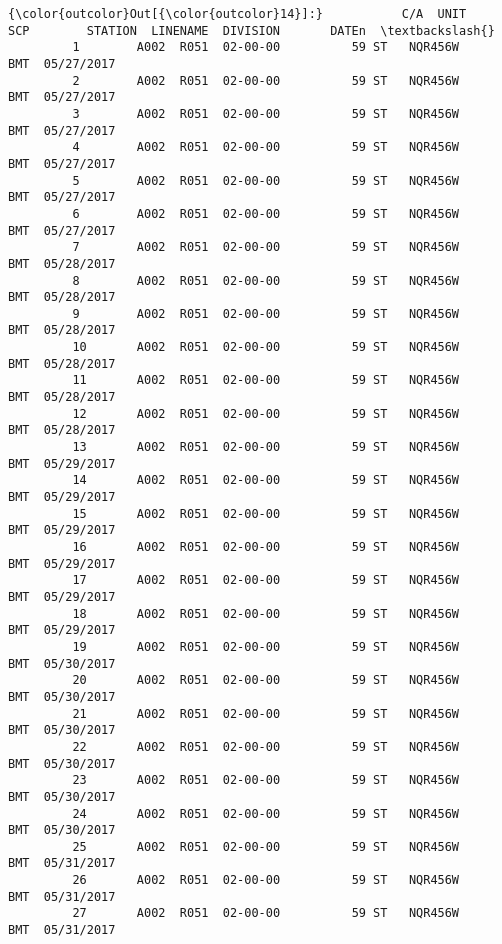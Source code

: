\documentclass[11pt]{article}
\begin{document}
\begin{Verbatim}[commandchars=\\\{\}]
{\color{outcolor}Out[{\color{outcolor}14}]:}           C/A  UNIT       SCP        STATION  LINENAME  DIVISION       DATEn  \textbackslash{}
         1        A002  R051  02-00-00          59 ST   NQR456W       BMT  05/27/2017   
         2        A002  R051  02-00-00          59 ST   NQR456W       BMT  05/27/2017   
         3        A002  R051  02-00-00          59 ST   NQR456W       BMT  05/27/2017   
         4        A002  R051  02-00-00          59 ST   NQR456W       BMT  05/27/2017   
         5        A002  R051  02-00-00          59 ST   NQR456W       BMT  05/27/2017   
         6        A002  R051  02-00-00          59 ST   NQR456W       BMT  05/27/2017   
         7        A002  R051  02-00-00          59 ST   NQR456W       BMT  05/28/2017   
         8        A002  R051  02-00-00          59 ST   NQR456W       BMT  05/28/2017   
         9        A002  R051  02-00-00          59 ST   NQR456W       BMT  05/28/2017   
         10       A002  R051  02-00-00          59 ST   NQR456W       BMT  05/28/2017   
         11       A002  R051  02-00-00          59 ST   NQR456W       BMT  05/28/2017   
         12       A002  R051  02-00-00          59 ST   NQR456W       BMT  05/28/2017   
         13       A002  R051  02-00-00          59 ST   NQR456W       BMT  05/29/2017   
         14       A002  R051  02-00-00          59 ST   NQR456W       BMT  05/29/2017   
         15       A002  R051  02-00-00          59 ST   NQR456W       BMT  05/29/2017   
         16       A002  R051  02-00-00          59 ST   NQR456W       BMT  05/29/2017   
         17       A002  R051  02-00-00          59 ST   NQR456W       BMT  05/29/2017   
         18       A002  R051  02-00-00          59 ST   NQR456W       BMT  05/29/2017   
         19       A002  R051  02-00-00          59 ST   NQR456W       BMT  05/30/2017   
         20       A002  R051  02-00-00          59 ST   NQR456W       BMT  05/30/2017   
         21       A002  R051  02-00-00          59 ST   NQR456W       BMT  05/30/2017   
         22       A002  R051  02-00-00          59 ST   NQR456W       BMT  05/30/2017   
         23       A002  R051  02-00-00          59 ST   NQR456W       BMT  05/30/2017   
         24       A002  R051  02-00-00          59 ST   NQR456W       BMT  05/30/2017   
         25       A002  R051  02-00-00          59 ST   NQR456W       BMT  05/31/2017   
         26       A002  R051  02-00-00          59 ST   NQR456W       BMT  05/31/2017   
         27       A002  R051  02-00-00          59 ST   NQR456W       BMT  05/31/2017   

\end{Verbatim}
\end{document}
